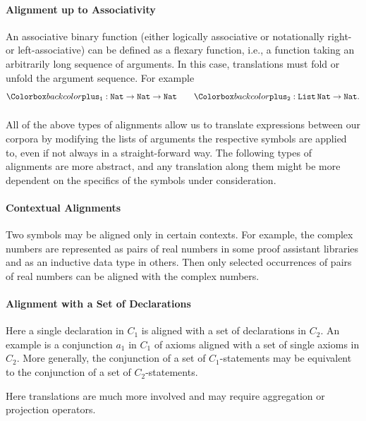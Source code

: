 \paragraph{Alignment up to Associativity}
An associative binary function (either logically associative or notationally right- or left-associative) can be defined as a flexary function, i.e., a function taking an arbitrarily long sequence of arguments.
In this case, translations must fold or unfold the argument sequence.
For example
\[\expr{plus_1:  Nat \to Nat \to Nat}\qquad
\expr{plus_2: List\, Nat\to Nat}.\]

\paragraph{} All of the above types of alignments allow us to translate expressions between our corpora by modifying the lists of arguments the respective symbols are applied to, even if not always in a straight-forward way. The following types of alignments are more abstract, and any translation along them might be more dependent on the specifics of the symbols under consideration.

\paragraph{Contextual Alignments}
Two symbols may be alig\-ned only in certain contexts.  For example, the complex numbers
are represented as pairs of real numbers in some proof assistant libraries and as an
inductive data type in others.  Then only selected occurrences of pairs of real numbers
can be aligned with the complex numbers.

\paragraph{Alignment with a Set of Declarations}
Here a single declaration in $C_1$ is aligned with a set of declarations in $C_2$.
An example is a conjunction $a_1$ in $C_1$ of axioms aligned with a set of single axioms in $C_2$.
More generally, the conjunction of a set of $C_1$-statements may be equivalent to the conjunction of a set of $C_2$-statements.

Here translations are much more involved and may require aggregation or projection operators.

